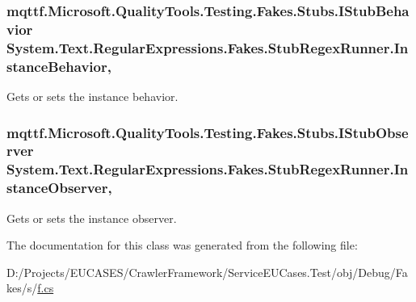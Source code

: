 \hypertarget{class_system_1_1_text_1_1_regular_expressions_1_1_fakes_1_1_stub_regex_runner_a0694eae3e2126eb73cbf9feec7e176bc}{
\subsubsection[{Instance\-Behavior}]{\setlength{\rightskip}{0pt plus 5cm}mqttf.\-Microsoft.\-Quality\-Tools.\-Testing.\-Fakes.\-Stubs.\-I\-Stub\-Behavior System.\-Text.\-Regular\-Expressions.\-Fakes.\-Stub\-Regex\-Runner.\-Instance\-Behavior\hspace{0.3cm}{\ttfamily [get]}, {\ttfamily [set]}}}\label{class_system_1_1_text_1_1_regular_expressions_1_1_fakes_1_1_stub_regex_runner_a0694eae3e2126eb73cbf9feec7e176bc}


Gets or sets the instance behavior.

\hypertarget{class_system_1_1_text_1_1_regular_expressions_1_1_fakes_1_1_stub_regex_runner_adccfc08a97092551ebed7f608d5459bf}{
\subsubsection[{Instance\-Observer}]{\setlength{\rightskip}{0pt plus 5cm}mqttf.\-Microsoft.\-Quality\-Tools.\-Testing.\-Fakes.\-Stubs.\-I\-Stub\-Observer System.\-Text.\-Regular\-Expressions.\-Fakes.\-Stub\-Regex\-Runner.\-Instance\-Observer\hspace{0.3cm}{\ttfamily [get]}, {\ttfamily [set]}}}\label{class_system_1_1_text_1_1_regular_expressions_1_1_fakes_1_1_stub_regex_runner_adccfc08a97092551ebed7f608d5459bf}


Gets or sets the instance observer.



The documentation for this class was generated from the following file\-:\begin{DoxyCompactItemize}
\item 
D\-:/\-Projects/\-E\-U\-C\-A\-S\-E\-S/\-Crawler\-Framework/\-Service\-E\-U\-Cases.\-Test/obj/\-Debug/\-Fakes/s/\hyperlink{s_2f_8cs}{f.\-cs}\end{DoxyCompactItemize}
